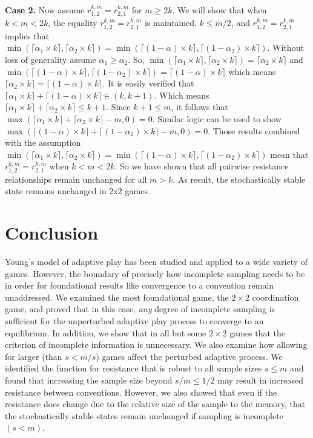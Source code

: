 \documentclass[11.5pt]{article}
\begin{document}
{\bf Case 2.} Now assume $r^{k,m}_{1,2} = r^{k,m}_{2,1}$ for $m \geq 2k$. We will show that when $k < m < 2k$, the equality $r^{k,m}_{1,2} = r^{k,m}_{2,1}$ is maintained. $k \leq m/2$, and $r^{k,m}_{1,2} = r^{k,m}_{2,1}$ implies that $\min(\lceil \alpha_1 \times k \rceil,\lceil \alpha_2 \times k \rceil) = \min(\lceil (1-\alpha) \times k \rceil,\lceil (1-\alpha_2) \times k \rceil)$. Without loss of generality assume $\alpha_1\geq \alpha_2$. So, $\min(\lceil \alpha_1 \times k \rceil,\lceil \alpha_2 \times k \rceil) = \lceil \alpha_2 \times k \rceil$ and $\min(\lceil (1-\alpha) \times k \rceil,\lceil (1-\alpha_2) \times k \rceil) = \lceil (1-\alpha) \times k \rceil$ which means $\lceil \alpha_2 \times k \rceil = \lceil (1-\alpha) \times k \rceil$. It is easily verified that $\lceil \alpha_1 \times k \rceil+\lceil (1-\alpha) \times k \rceil \in (k, k+1)$. Which means $\lceil \alpha_1 \times k \rceil+\lceil \alpha_2 \times k \rceil \leq k+1$. Since $k+1 \leq m$, it follows that $\max(\lceil \alpha_1 \times k \rceil+\lceil \alpha_2 \times k \rceil-m,0) = 0$. Similar logic can be used to show $\max(\lceil (1-\alpha) \times k \rceil+\lceil (1-\alpha_2) \times k \rceil-m,0) = 0$. Those results combined with the assumption $\min(\lceil \alpha_1 \times k \rceil,\lceil \alpha_2 \times k \rceil) = \min(\lceil (1-\alpha) \times k \rceil,\lceil (1-\alpha_2) \times k \rceil)$ mean that $r^{k,m}_{1,2} = r^{k,m}_{2,1}$ when $k < m < 2k$. So we have shown that all pairwise resistance relationships remain unchanged for all $m > k$. As result, the stochastically stable state remains unchanged in 2x2 games.

\section{Conclusion}

Young's model of adaptive play has been studied and applied to a wide variety of games. However, the boundary of precisely how incomplete sampling needs to be in order for foundational results like convergence to a convention remain unaddressed. We examined the most foundational game, the $2\times 2$ coordination game, and proved that in this case, \textit{any} degree of incomplete sampling is sufficient for the unperturbed adaptive play process to converge to an equilibrium. In addition, we show that in all but some $2 \times 2$ games that the criterion of incomplete information is unnecessary. We also examine how allowing for larger (than $s<m/s$) games affect the perturbed adaptive process. We identified the function for resistance that is robust to all sample sizes $s \leq m$ and found that increasing the sample size beyond $s/m \leq 1/2$ may result in increased resistance between conventions. However, we also showed that even if the resistance does change due to the relative size of the sample to the memory, that the stochastically stable states remain unchanged if sampling is incomplete $(s<m)$.

\newpage



\end{document}
